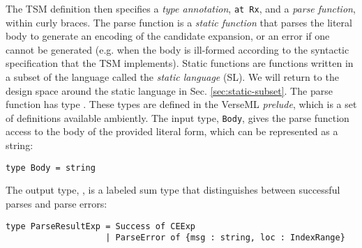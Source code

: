 The TSM definition then specifies a \emph{type annotation}, \lstinline{at Rx}, and a \emph{parse function}, within curly braces. 
The {parse function} is a \emph{static function} that parses the literal body to generate an encoding of the candidate expansion, or an error if one cannot be generated (e.g. when the body is ill-formed according to the syntactic specification that the TSM implements).  Static functions are functions written in a subset of the language called the \emph{static language} (SL). We will return to the design space around the static language in Sec. \ref{sec:static-subset}. The parse function has type . These types are defined in the VerseML \emph{prelude}, which is a set of definitions available ambiently. The input type, \lstinline{Body}, gives the parse function access to the {body} of the provided literal form, which can be represented as a string:
\begin{lstlisting}[numbers=none]
type Body = string
\end{lstlisting} 

The output type, , is a labeled sum type that distinguishes between successful parses and parse errors:
\begin{lstlisting}[numbers=none]
type ParseResultExp = Success of CEExp 
                    | ParseError of {msg : string, loc : IndexRange}
\end{lstlisting}


